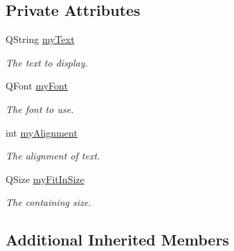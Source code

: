 \subsection*{Private Attributes}
\begin{DoxyCompactItemize}
\item 
\hypertarget{class_u_i_1_1_text_item_widget_a71fab6d706728ed57d9a32700f4608a9}{Q\-String \hyperlink{class_u_i_1_1_text_item_widget_a71fab6d706728ed57d9a32700f4608a9}{my\-Text}}\label{class_u_i_1_1_text_item_widget_a71fab6d706728ed57d9a32700f4608a9}

\begin{DoxyCompactList}\small\item\em The text to display. \end{DoxyCompactList}\item 
\hypertarget{class_u_i_1_1_text_item_widget_a1799f395045a4f957df301304c8b2fcd}{Q\-Font \hyperlink{class_u_i_1_1_text_item_widget_a1799f395045a4f957df301304c8b2fcd}{my\-Font}}\label{class_u_i_1_1_text_item_widget_a1799f395045a4f957df301304c8b2fcd}

\begin{DoxyCompactList}\small\item\em The font to use. \end{DoxyCompactList}\item 
\hypertarget{class_u_i_1_1_text_item_widget_a6e1a195ef5bd4d41e0ffdd32d5f09548}{int \hyperlink{class_u_i_1_1_text_item_widget_a6e1a195ef5bd4d41e0ffdd32d5f09548}{my\-Alignment}}\label{class_u_i_1_1_text_item_widget_a6e1a195ef5bd4d41e0ffdd32d5f09548}

\begin{DoxyCompactList}\small\item\em The alignment of text. \end{DoxyCompactList}\item 
\hypertarget{class_u_i_1_1_text_item_widget_a8224db11fc67efbc52d7d80df8d7e7bd}{Q\-Size \hyperlink{class_u_i_1_1_text_item_widget_a8224db11fc67efbc52d7d80df8d7e7bd}{my\-Fit\-In\-Size}}\label{class_u_i_1_1_text_item_widget_a8224db11fc67efbc52d7d80df8d7e7bd}

\begin{DoxyCompactList}\small\item\em The containing size. \end{DoxyCompactList}\end{DoxyCompactItemize}
\subsection*{Additional Inherited Members}


